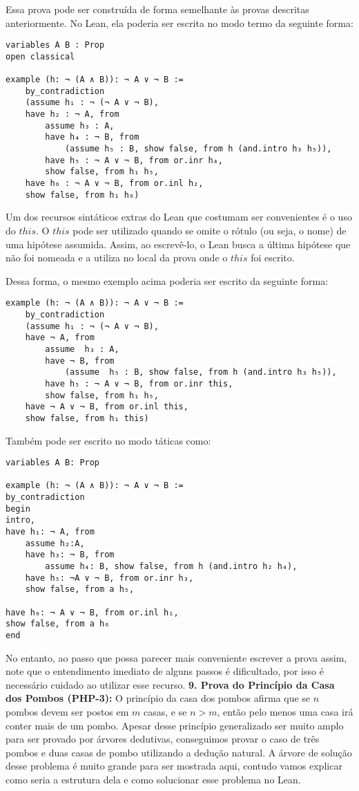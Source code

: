 Essa prova pode ser construída de forma semelhante às provas descritas anteriormente. No Lean, ela poderia ser escrita no modo termo da seguinte forma:
\begin{lstlisting} 
variables A B : Prop
open classical

example (h: ¬ (A ∧ B)): ¬ A ∨ ¬ B := 
    by_contradiction 
    (assume h₁ : ¬ (¬ A ∨ ¬ B),
    have h₂ : ¬ A, from 
        assume h₃ : A,
        have h₄ : ¬ B, from
            (assume h₅ : B, show false, from h (and.intro h₃ h₅)),
        have h₅ : ¬ A ∨ ¬ B, from or.inr h₄,
        show false, from h₁ h₅,   
    have h₆ : ¬ A ∨ ¬ B, from or.inl h₂, 
    show false, from h₁ h₆)
\end{lstlisting}

Um dos recursos sintáticos extras do Lean que costumam ser convenientes é o uso do $this$. O $this$ pode ser utilizado quando se omite o rótulo (ou seja, o nome) de uma hipótese assumida. Assim, ao escrevê-lo, o Lean busca a última hipótese que não foi nomeada e a utiliza no local da prova onde o $this$ foi escrito. 

Dessa forma, o mesmo exemplo acima poderia ser escrito da seguinte forma:

\begin{lstlisting}
example (h: ¬ (A ∧ B)): ¬ A ∨ ¬ B := 
    by_contradiction 
    (assume h₁ : ¬ (¬ A ∨ ¬ B),
    have ¬ A, from 
        assume  h₃ : A,
        have ¬ B, from
            (assume  h₅ : B, show false, from h (and.intro h₃ h₅)),
        have h₅ : ¬ A ∨ ¬ B, from or.inr this,
        show false, from h₁ h₅,   
    have ¬ A ∨ ¬ B, from or.inl this, 
    show false, from h₁ this)
\end{lstlisting}

Também pode ser escrito no modo táticas como:
\begin{lstlisting}
variables A B: Prop

example (h: ¬ (A ∧ B)): ¬ A ∨ ¬ B := 
by_contradiction
begin
intro,
have h₁: ¬ A, from
    assume h₂:A,
    have h₃: ¬ B, from
        assume h₄: B, show false, from h (and.intro h₂ h₄),
    have h₅: ¬A ∨ ¬ B, from or.inr h₃,
    show false, from a h₅,

have h₆: ¬ A ∨ ¬ B, from or.inl h₁,
show false, from a h₆
end
\end{lstlisting}

No entanto, ao passo que possa parecer mais conveniente escrever a prova assim, note que o entendimento imediato de alguns passos é dificultado, por isso é necessário cuidado ao utilizar esse recurso.
\bigbreak
\textbf{9. Prova do Princípio da Casa dos Pombos (PHP-3):}
    O princípio da casa dos pombos afirma que se $n$ pombos devem ser postos em $m$ casas, e se $n > m$, então pelo menos uma casa irá conter mais de um pombo. Apesar desse princípio  generalizado ser muito amplo para ser provado por árvores dedutivas, conseguimos provar o caso de três pombos e duas casas de pombo utilizando a dedução natural. A árvore de solução desse problema é muito grande para ser mostrada aqui, contudo vamos explicar como seria a estrutura dela e como solucionar esse problema no Lean. 
    
